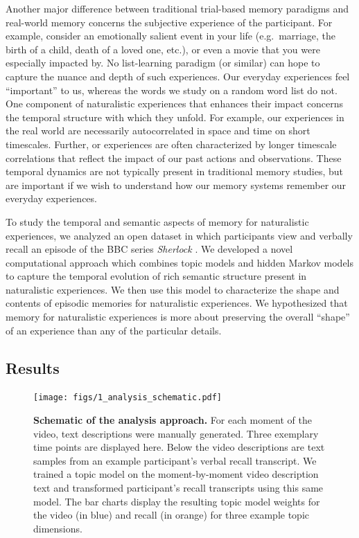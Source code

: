 \documentclass{article}
\begin{document}
{Another major difference between traditional trial-based memory paradigms and real-world memory concerns the subjective experience of the participant.  For example, consider an emotionally salient event in your life (e.g.\ marriage, the birth of a child, death of a loved one, etc.), or even a movie that you were especially impacted by.  No list-learning paradigm (or similar) can hope to capture the nuance and depth of such experiences.  Our everyday experiences feel ``important'' to us, whereas the words we study on a random word list do not.  One component of naturalistic experiences that enhances their impact concerns the temporal structure with which they unfold.  For example, our experiences in the real world are necessarily autocorrelated in space and time on short timescales.  Further, or experiences are often characterized by longer timescale correlations that reflect the impact of our past actions and observations.  These temporal dynamics are not typically present in traditional memory studies, but are important if we wish to understand how our memory systems remember our everyday experiences.

To study the temporal and semantic aspects of memory for naturalistic experiences, we analyzed an open dataset in which participants view and verbally recall an episode of the BBC series \textit{Sherlock}  \citep{ChenEtal17} .  We developed a novel computational approach which combines topic models \citep{BleiEtal03} and hidden Markov models to capture the temporal evolution of rich semantic structure present in naturalistic experiences. We then use this model to characterize the shape and contents of episodic memories for naturalistic experiences. We hypothesized that memory for naturalistic experiences is more about preserving the overall ``shape'' of an experience than any of the particular details.

\subsection{Results}

\begin{figure}[t!]
\centering
\texttt{[image: figs/1\_analysis\_schematic.pdf]}
\caption{\small \textbf{Schematic of the analysis approach.} For each moment of the video, text descriptions were manually generated. Three exemplary time points are displayed here.  Below the video descriptions are text samples from an example participant's verbal recall transcript.  We trained a topic model on the moment-by-moment video description text and transformed participant's recall transcripts using this same model. The bar charts display the resulting topic model weights for the video (in blue) and recall (in orange) for three example topic dimensions.}
\label{fig:schematic}
\end{figure}

}
\end{document}
